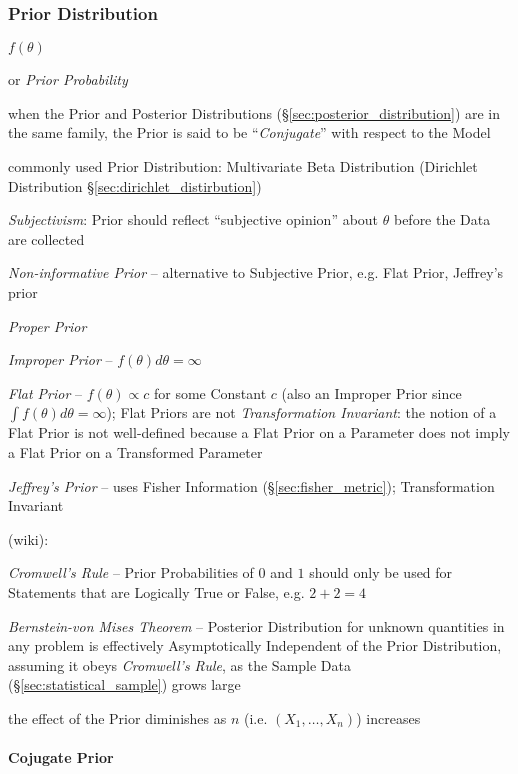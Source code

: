 \subsubsection{Prior Distribution}\label{sec:prior_distribution}

$f(\theta)$

or \emph{Prior Probability}

when the Prior and Posterior Distributions (\S\ref{sec:posterior_distribution})
are in the same family, the Prior is said to be ``\emph{Conjugate}'' with
respect to the Model

commonly used Prior Distribution: Multivariate Beta Distribution (Dirichlet
Distribution \S\ref{sec:dirichlet_distirbution})

\emph{Subjectivism}: Prior should reflect ``subjective opinion'' about $\theta$
before the Data are collected

\emph{Non-informative Prior} -- alternative to Subjective Prior, e.g. Flat
Prior, Jeffrey's prior

\emph{Proper Prior}

\emph{Improper Prior} -- $f(\theta) d\theta = \infty$

\emph{Flat Prior} -- $f(\theta) \propto c$ for some Constant $c$ (also an
Improper Prior since $\int f(\theta) d\theta = \infty$); Flat Priors are not
\emph{Transformation Invariant}: the notion of a Flat Prior is not well-defined
because a Flat Prior on a Parameter does not imply a Flat Prior on a Transformed
Parameter

\emph{Jeffrey's Prior} -- uses Fisher Information (\S\ref{sec:fisher_metric});
Transformation Invariant

(wiki):

\emph{Cromwell's Rule} -- Prior Probabilities of $0$ and $1$ should only be used
for Statements that are Logically True or False, e.g. $2+2 = 4$

\emph{Bernstein-von Mises Theorem} -- Posterior Distribution for unknown
quantities in any problem is effectively Asymptotically Independent of the Prior
Distribution, assuming it obeys \emph{Cromwell's Rule}, as the Sample Data
(\S\ref{sec:statistical_sample}) grows large

the effect of the Prior diminishes as $n$ (i.e. $(X_1, \ldots, X_n)$) increases



\paragraph{Cojugate Prior}\label{sec:conjugate_prior}\hfill


